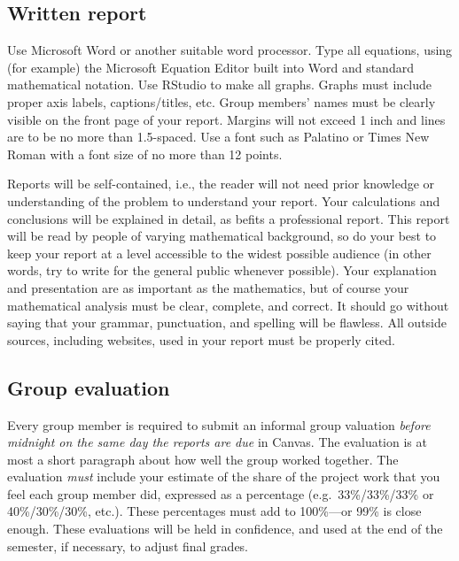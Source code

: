 \documentclass[11pt]{article}\usepackage[]{graphicx}\usepackage[]{color}
\begin{document}
\subsection*{Written report}

Use Microsoft Word or another suitable word processor. Type all equations,
using (for example) the Microsoft Equation Editor built into Word and standard
mathematical notation. Use RStudio to make all graphs. Graphs must include
proper axis labels, captions/titles, etc. Group members' names must be clearly
visible on the front page of your report. Margins will not exceed 1 inch and
lines are to be no more than 1.5-spaced. Use a font such as Palatino or Times
New Roman with a font size of no more than 12 points.

Reports will be self-contained, i.e., the reader will not need prior knowledge
or understanding of the problem to understand your report. Your calculations
and conclusions will be explained in detail, as befits a professional report.
This report will be read by people of varying mathematical background, so do
your best to keep your report at a level accessible to the widest possible
audience (in other words, try to write for the general public whenever
possible). Your explanation and presentation are as important as the
mathematics, but of course your mathematical analysis must be clear, complete,
and correct. It should go without saying that your grammar, punctuation, and
spelling will be flawless. All outside sources, including websites, used in
your report must be properly cited.

\subsection*{Group evaluation}

Every group member is required to submit an informal group valuation
\emph{before midnight on the same day the reports are due} in Canvas. The
evaluation is at most a short paragraph about how well the group worked
together. The evaluation \emph{must} include your estimate of the share of the
project work that you feel each group member did, expressed as a percentage
(e.g.~33\%/33\%/33\% or 40\%/30\%/30\%, etc.). These percentages must add to
100\%---or 99\% is close enough. These evaluations will be held in confidence,
and used at the end of the semester, if necessary, to adjust final grades.
\end{document}

